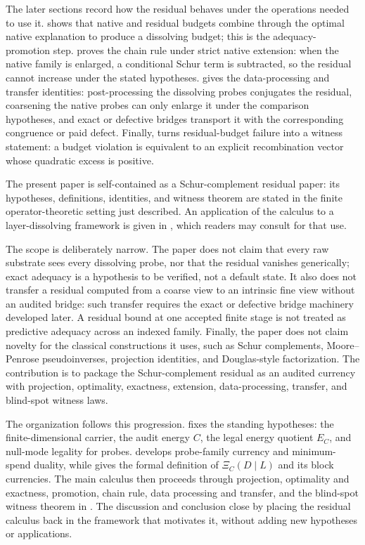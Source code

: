 \documentclass[11pt]{article}
\theoremstyle{definition}
\begin{document}
The later sections record how the residual behaves under the operations needed
to use it.   shows that native and residual budgets combine
through the optimal native explanation to produce a dissolving budget; this is
the adequacy-promotion step.   proves the chain rule under
strict native extension: when the native family is enlarged, a conditional
Schur term is subtracted, so the residual cannot increase under the stated
hypotheses.   gives the data-processing and transfer
identities: post-processing the dissolving probes conjugates the residual,
coarsening the native probes can only enlarge it under the comparison
hypotheses, and exact or defective bridges transport it with the corresponding
congruence or paid defect.  Finally,  turns residual-budget
failure into a witness statement: a budget violation is equivalent to an
explicit recombination vector whose quadratic excess is positive.

The present paper is self-contained as a Schur-complement residual paper:
its hypotheses, definitions, identities, and witness theorem are stated
in the finite operator-theoretic setting just described.  An application
of the calculus to a layer-dissolving framework is given in
\citet{Tsiokos2026NeedleKiller}, which readers may consult for that use.

The scope is deliberately narrow.  The paper does not claim that every raw
substrate sees every dissolving probe, nor that the residual vanishes
generically; exact adequacy is a hypothesis to be verified, not a default
state.  It also does not transfer a residual computed from a coarse view to an
intrinsic fine view without an audited bridge: such transfer requires the exact
or defective bridge machinery developed later.  A residual bound at one
accepted finite stage is not treated as predictive adequacy across an indexed
family.  Finally, the paper does not claim novelty for the classical
constructions it uses, such as Schur complements, Moore--Penrose
pseudoinverses, projection identities, and Douglas-style factorization.  The
contribution is to package the Schur-complement residual as an audited currency
with projection, optimality, exactness, extension, data-processing, transfer,
and blind-spot witness laws.

The organization follows this progression.   fixes the standing
hypotheses: the finite-dimensional carrier, the audit energy \(C\), the legal
energy quotient \(E_C\), and null-mode legality for probes.  
develops probe-family currency and minimum-spend duality, while
 gives the formal definition of
\(\Xi_C(D\mid L)\) and its block currencies.  The main calculus then proceeds
through projection, optimality and exactness, promotion, chain rule, data
processing and transfer, and the blind-spot witness theorem in
.
The discussion and conclusion close by placing the residual calculus back in
the framework that motivates it, without adding new hypotheses or applications.
\end{document}
